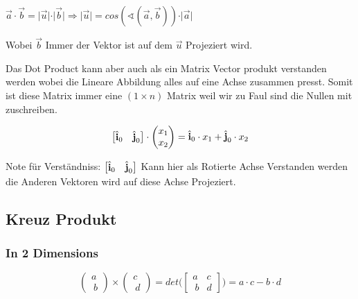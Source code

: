 \( \overrightarrow{a} \cdot \overrightarrow{b} = \vert \overrightarrow{u} \vert \cdot \vert \overrightarrow{b} \vert \Rightarrow \vert \overrightarrow{u} \vert =  cos(\sphericalangle (\overrightarrow{a}, \overrightarrow{b} )) \cdot \vert \overrightarrow{a} \vert \)

Wobei \( \overrightarrow{b} \) Immer der Vektor ist auf dem \( \overrightarrow{u} \) Projeziert wird. \newline 

Das Dot Product kann aber auch als ein Matrix Vector produkt verstanden werden wobei die Lineare Abbildung alles auf eine Achse zusammen presst. Somit ist diese Matrix immer eine \( ( 1 \times n ) \) Matrix weil wir zu Faul sind die Nullen mit zuschreiben.

\begin{equation} 
\begin{bmatrix}
\hat{\textbf{i}}_0 & \hat{\textbf{j}}_0
\end{bmatrix}  
\cdot 
\begin{pmatrix}
x_1 \\ x_2
\end{pmatrix} = \hat{\textbf{i}}_0 \cdot x_1 + \hat{\textbf{j}}_0 \cdot x_2 
\end{equation}


Note für Verständniss: \( \begin{bmatrix}
\hat{\textbf{i}}_0 & \hat{\textbf{j}}_0
\end{bmatrix}   \) Kann hier als Rotierte Achse Verstanden werden die Anderen Vektoren wird auf diese Achse Projeziert.

\subsection*{ Kreuz Produkt} 

\subsubsection*{ In 2 Dimensions}

\begin{equation}
	 \begin{pmatrix}
	 	a  \\\
	 	b
	 \end{pmatrix} \times 	 \begin{pmatrix}
	 	c  \\\
	 	d
	 \end{pmatrix} = det \bigg( \begin{bmatrix}
	 	a & c \\\
	 	b & d
	 \end{bmatrix} \bigg) = a \cdot c - b \cdot d
\end{equation}

